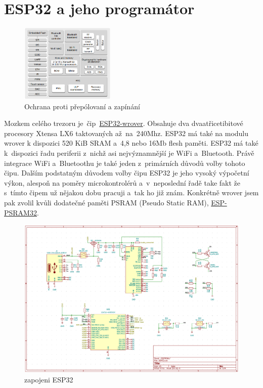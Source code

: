 \section{ESP32 a jeho programátor}


\begin{figure}
    \centering
    \includegraphics[width=0.4\textwidth]{kapitoly/obrazky/E4/ESP32/BlockDiagram.png}
    \caption{\label{fig:E4-ESP32-BlockDiagram}Ochrana proti přepólovaní a zapínání}
\end{figure}

Mozkem celého trezoru je~čip~\href{https://www.espressif.com/sites/default/files/documentation/esp32-wrover-b_datasheet_en.pdf}{ESP32-wrover}. 
Obsahuje dva dvaatřicetibitové procesory Xtensa LX6 taktovaných až~na~240Mhz. ESP32 má také na modulu wrover k dispozici 520 KiB SRAM 
a~4,8 nebo 16Mb flesh paměti. ESP32 má také k~dispozici řadu periferii z~nichž asi nejvýznamnější je WiFi a~Bluetooth. Právě integrace 
WiFi a~Bluetoothu je také jeden z~primárních důvodů volby tohoto čipu. Dalším podstatným důvodem volby čipu ESP32 je jeho vysoký výpočetní výkon, 
alespoň na poměry microkontrolérů a~v~neposlední řadě take fakt že s~tímto čipem už nějakou dobu pracuji a~tak ho již znám. Konkrétně wrover 
jsem pak zvolil kvůli dodatečné paměti PSRAM (Pseudo Static RAM), \href{http://gamma.spb.ru/images/pdf/esp-psram32_datasheet_en.pdf}{ESP-PSRAM32}.

\begin{figure}[htbp]
    \centering
    \includegraphics[width=\textwidth]{kapitoly/obrazky/E4/ESP32/sch.png}
    \caption{zapojeni ESP32}
    \label{fig:E4-step-up}
\end{figure}

